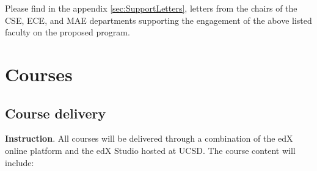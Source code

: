 \documentclass[11pt,letterpaper]{article}
\begin{document}
Please find in the appendix \ref{sec:SupportLetters}, letters from the
chairs of the CSE, ECE, and MAE departments supporting the engagement
of the above listed faculty on the proposed program.

\section{Courses}
\label{sec:courses}
\subsection{Course delivery}

{\bf Instruction}​. All courses will be delivered through a combination
of the edX online platform and the edX Studio hosted at UCSD. The
course content will include:
\end{document}
